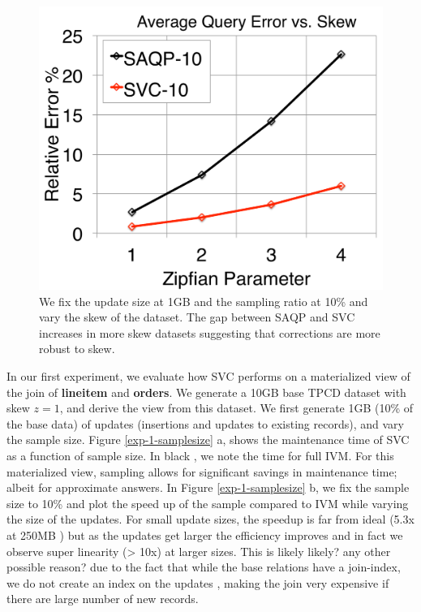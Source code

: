 \begin{figure}[t]
\centering
  \includegraphics[scale=0.15]{exp/msj_5.pdf}
 \caption{We fix the update size at 1GB and the sampling ratio at 10\% and vary the skew of the dataset. The gap between SAQP and SVC increases in more skew datasets suggesting that corrections are more robust to skew. \label{exp-1-zipf}}
\end{figure}

In our first experiment, we evaluate how SVC performs on a materialized view of the join of \textbf{lineitem} and \textbf{orders}.
We generate a 10GB base TPCD dataset with skew $z=1$, and derive the view from this dataset.
We first generate 1GB (10\% of the base data) of updates (insertions and updates to existing records), and vary the sample size.
Figure \ref{exp-1-samplesize} a, shows the maintenance time of SVC as a function of sample size.
In black , we note the time for full IVM. 
For this materialized view, sampling allows for significant savings in maintenance time; albeit for approximate answers.
In Figure \ref{exp-1-samplesize} b, we fix the sample size to 10\% and plot the speed up of the sample compared to IVM while varying the size of the updates.
For small update sizes, the speedup is far from ideal (5.3x at 250MB ) but as the updates get larger the efficiency improves and in fact we observe super linearity (> 10x) at larger sizes.
This is likely {likely? any other possible reason? } due to the fact that while the base relations have a join-index, we do not create an index on the updates , making the join very expensive if there are large number of new records. 


